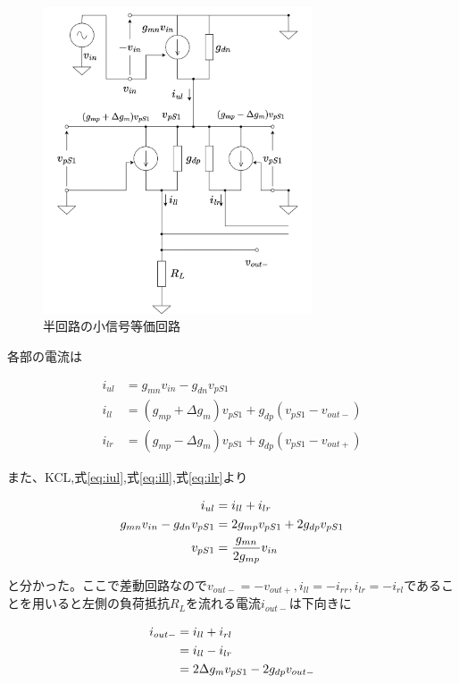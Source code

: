 \documentclass[twocolumn]{jsarticle}
\begin{document}
\begin{figure}[h]
    \begin{center}
        \includegraphics*[width=80mm]{figures/FoldedGilbertHalfBaseEquivalentCircuit.png}
        \caption{半回路の小信号等価回路}
    \end{center}
\end{figure}

各部の電流は

\begin{align}
    i_{ul}&=g_{mn}v_{in}-g_{dn}v_{pS1} \label{eq:iul}\\
    i_{ll}&=(g_{mp}+\Delta g_{m})v_{pS1}+g_{dp}(v_{pS1}-v_{out-}) \label{eq:ill}\\
    i_{lr}&=(g_{mp}-\Delta g_{m})v_{pS1}+g_{dp}(v_{pS1}-v_{out+}) \label{eq:ilr}
\end{align}

また、KCL,式\eqref{eq:iul},式\eqref{eq:ill},式\eqref{eq:ilr}より

\begin{align}
    i_{ul}&=i_{ll}+i_{lr} \notag\\
    g_{mn}v_{in}-g_{dn}v_{pS1}&=2g_{mp}v_{pS1}+2g_{dp}v_{pS1} \notag\\
    v_{pS1}&=\frac{g_{mn}}{2g_{mp}}v_{in} \label{eq:vps}
\end{align}

と分かった。ここで差動回路なので$v_{out-}=-v_{out+},i_{ll}=-i_{rr},i_{lr}=-i_{rl}$であることを用いると左側の負荷抵抗$R_{L}$を流れる電流$i_{out-}$は下向きに

\begin{align}
    i_{out-}&=i_{ll}+i_{rl} \notag\\
    &=i_{ll}-i_{lr} \notag\\
    &=2\Delta g_{m}v_{pS1}-2g_{dp}v_{out-}
\end{align}
\end{document}

